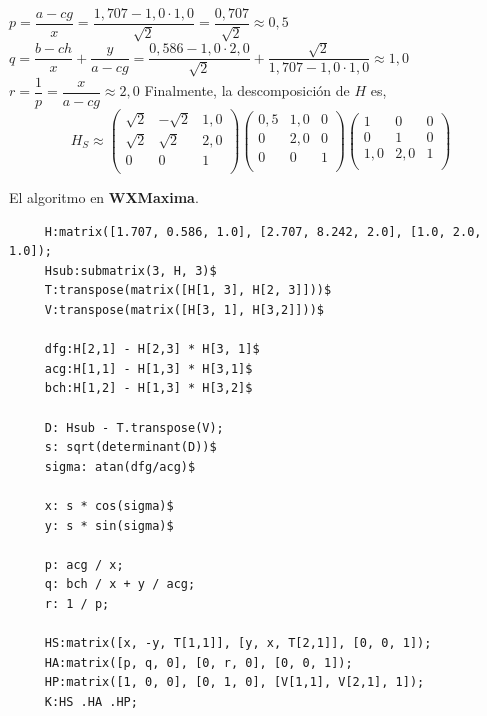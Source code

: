 \documentclass[12pt,a4paper]{article}
\begin{document}
	 $p = \dfrac{a-cg}{x} = \dfrac{1,707-1,0\cdot 1,0}{\sqrt{2}}=\dfrac{0,707}{\sqrt{2}}\approx 0,5$\newline
	 $q = \dfrac{b-ch}{x} + \dfrac{y}{a-cg} = \dfrac{0,586-1,0\cdot 2,0}{\sqrt{2}} + \dfrac{\sqrt{2}}{1,707-1,0\cdot 1,0} \approx 1,0 $\newline
	 $r = \dfrac{1}{p} = \dfrac{x}{a-cg}\approx 2,0$\newline\newline
	 Finalmente, la descomposición de $H$ es,
	 \newline\newline
	 $$H_S\approx\begin{pmatrix}
	 \sqrt{2} & -\sqrt{2} & 1,0\\
	 \sqrt{2} & \sqrt{2} & 2,0\\
	 0 & 0 & 1 \\ 
	 \end{pmatrix} \begin{pmatrix}
	 0,5 & 1,0 & 0\\
	 0 & 2,0 & 0\\
	 0 & 0 & 1 \\ 
	 \end{pmatrix} \begin{pmatrix}
	 1 & 0 & 0\\
	 0 & 1 & 0\\
	 1,0 & 2,0 & 1 \\ 
	 \end{pmatrix}$$
	 
	 \newpage
	 El algoritmo en \textbf{WXMaxima}.
	 \begin{verbatim}
	 H:matrix([1.707, 0.586, 1.0], [2.707, 8.242, 2.0], [1.0, 2.0, 1.0]);
	 Hsub:submatrix(3, H, 3)$
	 T:transpose(matrix([H[1, 3], H[2, 3]]))$
	 V:transpose(matrix([H[3, 1], H[3,2]]))$
	 
	 dfg:H[2,1] - H[2,3] * H[3, 1]$
	 acg:H[1,1] - H[1,3] * H[3,1]$
	 bch:H[1,2] - H[1,3] * H[3,2]$
	 
	 D: Hsub - T.transpose(V);
	 s: sqrt(determinant(D))$
	 sigma: atan(dfg/acg)$
	 
	 x: s * cos(sigma)$
	 y: s * sin(sigma)$
	 
	 p: acg / x;
	 q: bch / x + y / acg;
	 r: 1 / p;
	 
	 HS:matrix([x, -y, T[1,1]], [y, x, T[2,1]], [0, 0, 1]);
	 HA:matrix([p, q, 0], [0, r, 0], [0, 0, 1]);
	 HP:matrix([1, 0, 0], [0, 1, 0], [V[1,1], V[2,1], 1]);
	 K:HS .HA .HP;
	 \end{verbatim}
	 
\end{document}
